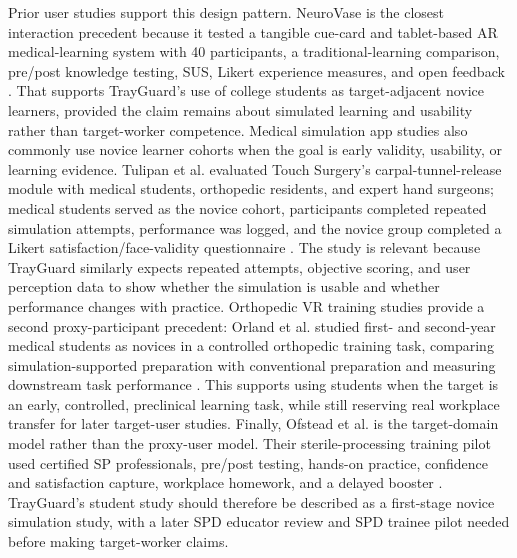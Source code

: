 \documentclass[10pt,a4paper]{article}
\begin{document}
Prior user studies support this design pattern. NeuroVase is the closest
interaction precedent because it tested a tangible cue-card and tablet-based AR
medical-learning system with 40 participants, a traditional-learning comparison,
pre/post knowledge testing, SUS, Likert experience measures, and open feedback
\cite{jahani-et-al-2026-neurovase}.
That supports TrayGuard's use of college students as target-adjacent novice
learners, provided the claim remains about simulated learning and usability
rather than target-worker competence.
Medical simulation app studies also commonly use novice learner cohorts when
the goal is early validity, usability, or learning evidence. Tulipan et al.
evaluated Touch Surgery's carpal-tunnel-release module with medical students,
orthopedic residents, and expert hand surgeons; medical students served as the
novice cohort, participants completed repeated simulation attempts, performance
was logged, and the novice group completed a Likert satisfaction/face-validity
questionnaire \cite{tulipan-et-al-2019}.
The study is relevant because TrayGuard similarly expects repeated attempts,
objective scoring, and user perception data to show whether the simulation is
usable and whether performance changes with practice.
Orthopedic VR training studies provide a second proxy-participant precedent:
Orland et al. studied first- and second-year medical students as novices in a
controlled orthopedic training task, comparing simulation-supported preparation
with conventional preparation and measuring downstream task performance
\cite{orland-et-al-2020}. This supports using
students when the target is an early, controlled, preclinical learning task,
while still reserving real workplace transfer for later target-user studies.
Finally, Ofstead et al. is the target-domain model rather than the proxy-user
model. Their sterile-processing training pilot used certified SP professionals,
pre/post testing, hands-on practice, confidence and satisfaction capture,
workplace homework, and a delayed booster
\cite{ofstead-et-al-2023}. TrayGuard's
student study should therefore be described as a first-stage novice simulation
study, with a later SPD educator review and SPD trainee pilot needed before
making target-worker claims.
\end{document}

